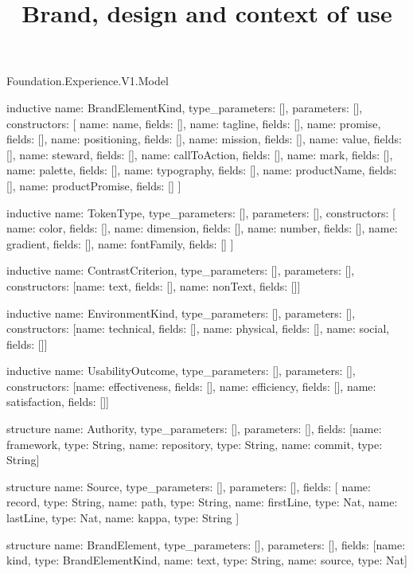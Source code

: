 \begin{lexlean}{Foundation.Experience.V1.Model}
\title{Brand, design and context of use}
\begin{semanticmodule}
inductive{
  name: BrandElementKind,
  type_parameters: [],
  parameters: [],
  constructors: [
    {name: name, fields: []},
    {name: tagline, fields: []},
    {name: promise, fields: []},
    {name: positioning, fields: []},
    {name: mission, fields: []},
    {name: value, fields: []},
    {name: steward, fields: []},
    {name: callToAction, fields: []},
    {name: mark, fields: []},
    {name: palette, fields: []},
    {name: typography, fields: []},
    {name: productName, fields: []},
    {name: productPromise, fields: []}
  ]
}

inductive{
  name: TokenType,
  type_parameters: [],
  parameters: [],
  constructors: [
    {name: color, fields: []},
    {name: dimension, fields: []},
    {name: number, fields: []},
    {name: gradient, fields: []},
    {name: fontFamily, fields: []}
  ]
}

inductive{
  name: ContrastCriterion,
  type_parameters: [],
  parameters: [],
  constructors: [{name: text, fields: []}, {name: nonText, fields: []}]
}

inductive{
  name: EnvironmentKind,
  type_parameters: [],
  parameters: [],
  constructors: [{name: technical, fields: []}, {name: physical, fields: []}, {name: social, fields: []}]
}

inductive{
  name: UsabilityOutcome,
  type_parameters: [],
  parameters: [],
  constructors: [{name: effectiveness, fields: []}, {name: efficiency, fields: []}, {name: satisfaction, fields: []}]
}

structure{
  name: Authority,
  type_parameters: [],
  parameters: [],
  fields: [{name: framework, type: String}, {name: repository, type: String}, {name: commit, type: String}]
}

structure{
  name: Source,
  type_parameters: [],
  parameters: [],
  fields: [
    {name: record, type: String},
    {name: path, type: String},
    {name: firstLine, type: Nat},
    {name: lastLine, type: Nat},
    {name: kappa, type: String}
  ]
}

structure{
  name: BrandElement,
  type_parameters: [],
  parameters: [],
  fields: [{name: kind, type: BrandElementKind}, {name: text, type: String}, {name: source, type: Nat}]
}


\end{semanticmodule}
\end{lexlean}
